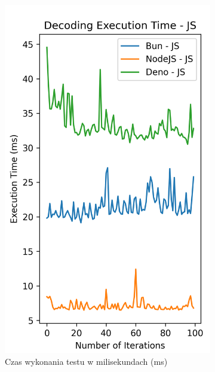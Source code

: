 \begin{figure}[H]
  \centering
  \begin{subfigure}[b]{0.4\textwidth}
    \centering
    \includegraphics[width=\textwidth]{Figures/coding/base64_100_decoding_js_time.png}
    \caption{Czas wykonania testu w milisekundach (ms)}
    \label{fig:decoding_e1_js_time}
  \end{subfigure}
  \begin{subfigure}[b]{0.4\textwidth}
    \centering

\end{subfigure}
\end{figure}
